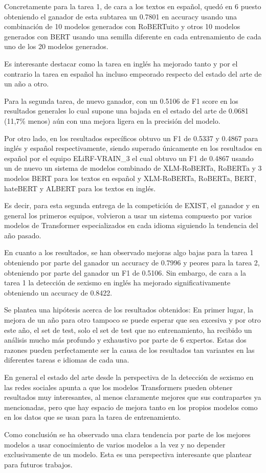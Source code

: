 Concretamente para la tarea 1, de cara a los textos en español, quedó en 6 puesto obteniendo el ganador de esta subtarea un 0.7801 en accuracy usando una combinación de 10 modelos generados con RoBERTuito y otros 10 modelos generados con BERT usando una semilla diferente en cada entrenamiento de cada uno de los 20 modelos generados.

Es interesante destacar como la tarea en inglés ha mejorado tanto y por el contrario la tarea en español ha incluso empeorado respecto del estado del arte de un año a otro.

Para la segunda tarea, de nuevo ganador, con un 0.5106 de F1 score en los resultados generales lo cual supone una bajada en el estado del arte de 0.0681 (11,7\% menos) aún con una mejora ligera en la precisión del modelo.

Por otro lado, en los resultados específicos obtuvo un F1 de 0.5337 y 0.4867 para inglés y español respectivamente, siendo superado únicamente en los resultados en español por el equipo ELiRF-VRAIN\_3 el cual obtuvo un F1 de 0.4867 usando un de nuevo un sistema de modelos combinado de XLM-RoBERTa, RoBERTa y 3 modelos BERT para los textos en español y XLM-RoBERTa, RoBERTa, BERT, hateBERT \cite{ caselli2020hatebert} y ALBERT \cite{ lan2019albert} para los textos en inglés. 

Es decir, para esta segunda entrega de la competición de EXIST, el ganador y en general los primeros equipos, volvieron a usar un sistema compuesto por varios modelos de Transformer especializados en cada idioma siguiendo la tendencia del año pasado.

En cuanto a los resultados, se han observado mejoras algo bajas para la tarea 1 obteniendo por parte del ganador un accuracy de 0.7996 y peores para la tarea 2, obteniendo por parte del ganador un F1 de 0.5106. Sin embargo, de cara a la tarea 1 la detección de sexismo en inglés ha mejorado significativamente obteniendo un accuracy de 0.8422.

Se plantea una hipótesis acerca de los resultados obtenidos: En primer lugar, la mejora de un año para otro tampoco se puede esperar que sea excesiva y por otro este año, el set de test, solo el set de test que no entrenamiento, ha recibido un análisis mucho más profundo y exhaustivo por parte de 6 expertos. Estas dos razones pueden perfectamente ser la causa de los resultados tan variantes en las diferentes tareas e idiomas de cada una.

En general el estado del arte desde la perspectiva de la detección de sexismo en las redes sociales apunta a que los modelos Transformers pueden obtener resultados muy interesantes, al menos claramente mejores que sus contrapartes ya mencionadas, pero que hay espacio de mejora tanto en los propios modelos como en los datos que se usan para la tarea de entrenamiento. 

Como conclusión se ha observado una clara tendencia por parte de los mejores modelos a usar conocimiento de varios modelos a la vez y no depender exclusivamente de un modelo. Esta es una perspectiva interesante que plantear para futuros trabajos.